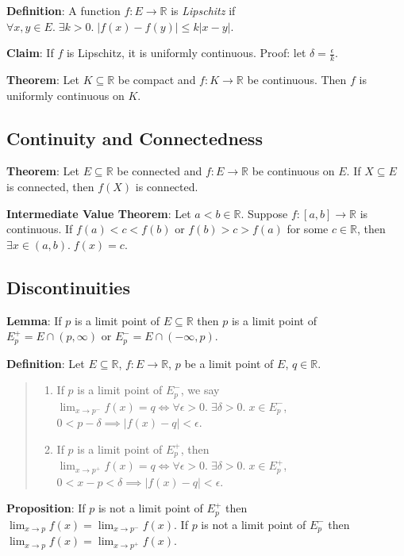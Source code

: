 \documentclass[11pt]{article}
\begin{document}
\textbf{Definition}: A function $f : E \to \mathbb{R}$ is \emph{Lipschitz} if $\forall x,y \in E.\; \exists k > 0.\; |f(x) - f(y)| \leq k|x-y|$.

\textbf{Claim}: If $f$ is Lipschitz, it is uniformly continuous. Proof: let $\delta = \frac{\epsilon}{k}$.

\textbf{Theorem}: Let $K \subseteq \mathbb{R}$ be compact and $f : K \to \mathbb{R}$ be continuous. Then $f$ is uniformly continuous on $K$.

\subsection{Continuity and Connectedness}

\textbf{Theorem}: Let $E \subseteq \mathbb{R}$ be connected and $f : E \to \mathbb{R}$ be continuous on $E$. If $X \subseteq E$ is connected, then $f(X)$ is connected.

\textbf{Intermediate Value Theorem}: Let $a < b \in \mathbb{R}$. Suppose $f : [a,b] \to \mathbb{R}$ is continuous. If $f(a) < c < f(b)$ or $f(b) > c > f(a)$ for some $c \in \mathbb{R}$, then $\exists x \in (a,b).\; f(x) = c$.

\subsection{Discontinuities}

\textbf{Lemma}: If $p$ is a limit point of $E \subseteq \mathbb{R}$ then $p$ is a limit point of $E_p^+ = E \cap (p, \infty)$ or $E_p^- = E \cap (-\infty, p)$.

\textbf{Definition}: Let $E \subseteq \mathbb{R}$, $f : E \to \mathbb{R}$, $p$ be a limit point of $E$, $q \in \mathbb{R}$.
\begin{quote}\vspace{-0.3cm}
	\begin{enumerate}
	\item If $p$ is a limit point of $E_p^-$, we say $\lim_{x \to p^-} f(x) = q \iff \forall \epsilon > 0.\; \exists \delta > 0.\; x \in E_p^-$, $0 < p - \delta \implies |f(x) - q| < \epsilon$.
	\item If $p$ is a limit point of $E_p^+$, then $\lim_{x \to p^+} f(x) = q \iff \forall \epsilon > 0.\; \exists \delta > 0.\; x \in E_p^+$, $0 < x-p < \delta \implies |f(x) - q| < \epsilon$.
	\end{enumerate}
\end{quote}

\textbf{Proposition}: If $p$ is not a limit point of $E_p^+$ then $\lim_{x \to p} f(x) = \lim_{x \to p^-} f(x)$. If $p$ is not a limit point of $E_p^-$ then $\lim_{x \to p} f(x) = \lim_{x \to p^+} f(x)$.
\end{document}
